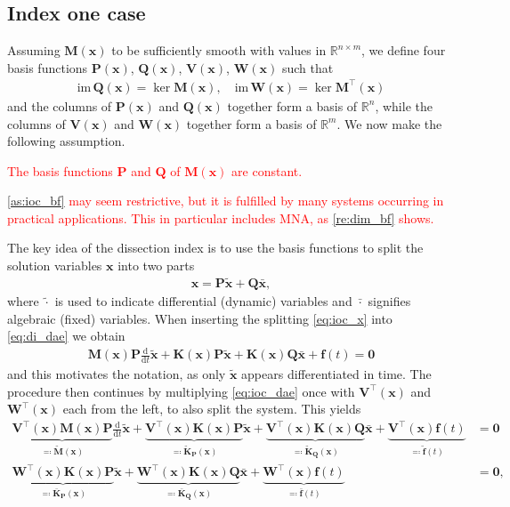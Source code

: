 \documentclass[AMA,STIX1COL]{WileyNJD-v2}
\newcommand{\mb}[1]{\mathbf{#1}}
\newcommand{\mbt}[1]{\tilde{\mathbf{#1}}}
\newcommand{\mbb}[1]{\bar{\mathbf{#1}}}
\newcommand{\mr}[1]{\mathrm{#1}}
\newcommand{\T}{{\!\top}}
\newcommand{\ddt}{\frac{\mathrm{d}}{\mathrm{d}t}}
\begin{document}
\subsection{Index one case}
\label{subsec:ioc}
Assuming $\mb{M}(\mb{x})$ to be sufficiently smooth with values in $\mathbb{R}^{n \times m}$, we define four basis functions $\mb{P}(\mb{x})$, $\mb{Q}(\mb{x})$, $\mb{V}(\mb{x})$, $\mb{W}(\mb{x})$ such that
\begin{align*}
    \mr{im\, } \mb{Q}(\mb{x}) = \ker \mb{M}(\mb{x}), \quad \mr{im\, } \mb{W}(\mb{x}) = \ker \mb{M}^\T (\mb{x})
\end{align*}
and the columns of $\mb{P}(\mb{x})$ and $\mb{Q}(\mb{x})$ together form a basis of $\mathbb{R}^n$, while the columns of $\mb{V}(\mb{x})$ and $\mb{W}(\mb{x})$ together form a basis of $\mathbb{R}^m$. We now make the following assumption.
\textcolor{red}{\begin{assumption}
    \label{as:ioc_bf}
    The basis functions $\mb{P}$ and $\mb{Q}$ of $\mb{M}(\mb{x})$ are constant.
\end{assumption}
\autoref{as:ioc_bf} may seem restrictive, but it is fulfilled by many systems occurring in practical applications\cite{jansen2014}. This in particular includes MNA, as \autoref{re:dim_bf} shows.} The key idea of the dissection index is to use the basis functions to split the solution variables $\mb{x}$ into two parts
\begin{align}
    \mb{x} = \mb{P} \mbt{x} + \mb{Q} \mbb{x}, \label{eq:ioc_x}
\end{align}
where $\tilde{\cdot}$ is used to indicate differential (dynamic) variables and $\bar{\cdot}$ signifies algebraic (fixed) variables. When inserting the splitting \eqref{eq:ioc_x} into \eqref{eq:di_dae} we obtain
\begin{align}
    \mb{M}(\mb{x}) \mb{P} \ddt \mbt{x} + \mb{K}(\mb{x}) \mb{P} \mbt{x} + \mb{K}(\mb{x}) \mb{Q} \mbb{x} + \mb{f}(t) = \mb{0} \label{eq:ioc_dae}
\end{align}
and this motivates the notation, as only $\mbt{x}$ appears differentiated in time. The procedure then continues by multiplying \eqref{eq:ioc_dae} once with $\mb{V}^\T (\mb{x})$ and $\mb{W}^\T (\mb{x})$ each from the left, to also split the system. This yields
\begin{subequations}
    \label{eq:ioc_io}
    \begin{align}
            \underbrace{\mb{V}^\T (\mb{x}) \mb{M}(\mb{x}) \mb{P}}_{\eqqcolon \mbt{M}(\mb{x})} \ddt \mbt{x} + \underbrace{\mb{V}^\T (\mb{x}) \mb{K}(\mb{x}) \mb{P}}_{\eqqcolon \mbt{K}_\mb{P}(\mb{x})} \mbt{x} + \underbrace{\mb{V}^\T (\mb{x}) \mb{K}(\mb{x}) \mb{Q}}_{\eqqcolon \mbt{K}_\mb{Q}(\mb{x})} \mbb{x} + \underbrace{\mb{V}^\T (\mb{x}) \mb{f}(t)}_{\eqqcolon \mbt{f}(t)} &= \mb{0} \label{eq:ioc_ioa}\\
            \underbrace{\mb{W}^\T (\mb{x}) \mb{K}(\mb{x}) \mb{P}}_{\eqqcolon \mbb{K}_\mb{P}(\mb{x})} \mbt{x} + \underbrace{\mb{W}^\T (\mb{x}) \mb{K}(\mb{x}) \mb{Q}}_{\eqqcolon \mbb{K}_\mb{Q}(\mb{x})} \mbb{x} + \underbrace{\mb{W}^\T (\mb{x}) \mb{f}(t)}_{\eqqcolon \mbb{f}(t)} &= \mb{0}, \label{eq:ioc_iob}
    \end{align}
\end{subequations}
\end{document}
